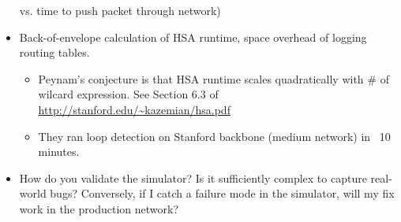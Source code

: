 \begin{itemize}
vs. time to push packet through network)
\item Back-of-envelope calculation of HSA runtime, space overhead of logging routing tables.
    \begin{itemize}
    \item Peynam's conjecture is that HSA runtime scales quadratically with \#
    of wilcard expression.  See Section 6.3 of
    \url{http://stanford.edu/~kazemian/hsa.pdf}
    \item They ran loop detection on Stanford backbone (medium network) in ~10
    minutes.
    \end{itemize}
\item How do you validate the simulator? Is it sufficiently complex to
capture real-world bugs? Conversely, if I catch a failure mode in the
simulator, will my fix work in the production network?
\end{itemize}
